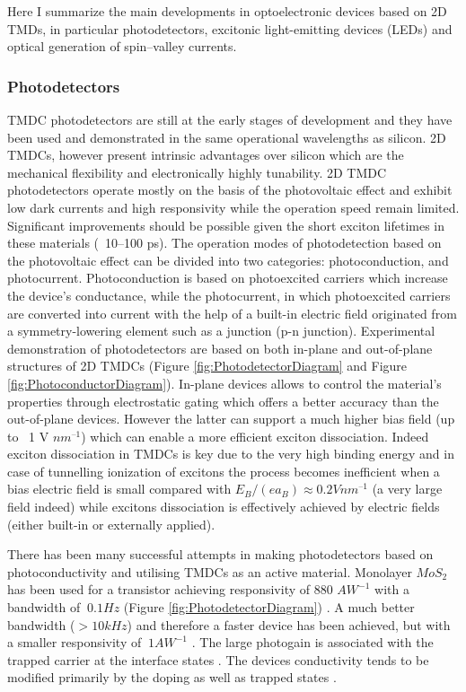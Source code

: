 Here I summarize the main developments in optoelectronic devices based on 2D TMDs, in particular photodetectors, excitonic light-emitting devices (LEDs) and optical generation of spin–valley currents. 

\subsubsection{Photodetectors}

TMDC photodetectors are still at the early stages of development and they have been used and demonstrated in the same operational wavelengths as silicon. 2D TMDCs, however present intrinsic advantages over silicon  which are the mechanical flexibility and electronically highly tunability.
2D TMDC photodetectors operate mostly on the basis of the photovoltaic effect and exhibit low dark currents and high responsivity while the operation speed remain limited. Significant improvements should be possible given the short exciton lifetimes in these materials (~10–100 ps)\cite{Massicotte2015}\cite{Korn2011}\cite{Wang2012}. The operation modes of photodetection based on the photovoltaic effect can be divided \cite{Sze2002} into two categories: photoconduction, and photocurrent. Photoconduction is based on photoexcited carriers which increase the device's conductance, while the photocurrent, in which photoexcited carriers are converted into current with the help of a built-in electric field originated from a symmetry-lowering element such as a junction (p-n junction).
Experimental demonstration of photodetectors are based on both in-plane and out-of-plane structures of 2D TMDCs (Figure \ref{fig:PhotodetectorDiagram} and Figure \ref{fig:PhotoconductorDiagram}). In-plane devices allows to control the material's properties through electrostatic gating which offers a better accuracy than the out-of-plane devices. However the latter can support a much higher bias field (up to ~1 V $nm^{–1}$) which can enable a more efficient exciton dissociation. Indeed exciton dissociation in TMDCs is key due to the very high binding energy and in case of tunnelling ionization of excitons the process becomes inefficient when a bias electric field is small compared with $E_B/(ea_B) \approx 0.2 V nm^{–1}$ (a very large field indeed)\cite{Haug1994} while excitons dissociation is effectively achieved by electric fields (either built-in or externally applied).

There has been many successful attempts in making photodetectors based on photoconductivity and utilising TMDCs as an active material. Monolayer $MoS_2$ has been used for a transistor achieving responsivity of 880 $AW^{-1}$ with a bandwidth of $~0.1 Hz$ (Figure \ref{fig:PhotodetectorDiagram}) \cite{Lopez-Sanchez2013}. A much better bandwidth ($>10 kHz$) and therefore a faster device has been achieved, but with a smaller responsivity of $~1 AW^{-1}$ \cite{Tsai2013}. The large photogain is associated with the trapped carrier at the interface states \cite{Katz2001}. The devices conductivity tends to be modified primarily by the doping as well as trapped states \cite{Tsai2013} \cite{Furchi2014}.

